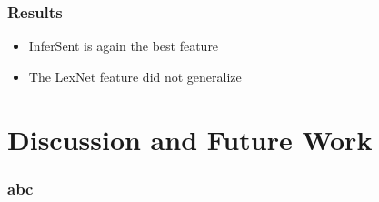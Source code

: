 \documentclass[11pt,aspectratio=169]{beamer}
\begin{document}
    \begin{frame}
      \frametitle{Results}
        \begin{itemize}
            \item InferSent is again the best feature
            \item The LexNet feature did not generalize
        \end{itemize}
    \end{frame}

    \section{Discussion and Future Work}
    \frame{\sectionpage}
    \begin{frame}
        \frametitle{abc}

    \end{frame}
\end{document}
